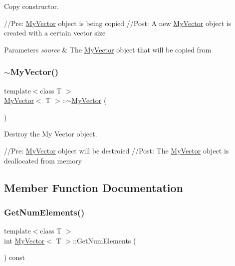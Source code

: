 Copy constructor. 

//\+Pre\+: \mbox{\hyperlink{class_my_vector}{My\+Vector}} object is being copied //\+Post\+: A new \mbox{\hyperlink{class_my_vector}{My\+Vector}} object is created with a certain vector size 
\begin{DoxyParams}{Parameters}
{\em source} & The \mbox{\hyperlink{class_my_vector}{My\+Vector}} object that will be copied from \\
\hline
\end{DoxyParams}
\mbox{\label{class_my_vector_abe59f181259ff63fa583f4bd87a9737e}} 
\subsubsection{\texorpdfstring{$\sim$MyVector()}{~MyVector()}}
{\footnotesize\ttfamily template$<$class T $>$ \\
\mbox{\hyperlink{class_my_vector}{My\+Vector}}$<$ T $>$\+::$\sim$\mbox{\hyperlink{class_my_vector}{My\+Vector}} (\begin{DoxyParamCaption}{ }\end{DoxyParamCaption})}



Destroy the My Vector object. 

//\+Pre\+: \mbox{\hyperlink{class_my_vector}{My\+Vector}} object will be destroied //\+Post\+: The \mbox{\hyperlink{class_my_vector}{My\+Vector}} object is deallocated from memory 

\subsection{Member Function Documentation}
\mbox{\label{class_my_vector_a5806423f48877c084cc436ecdffa756c}} 
\subsubsection{\texorpdfstring{GetNumElements()}{GetNumElements()}}
{\footnotesize\ttfamily template$<$class T $>$ \\
int \mbox{\hyperlink{class_my_vector}{My\+Vector}}$<$ T $>$\+::Get\+Num\+Elements (\begin{DoxyParamCaption}{ }\end{DoxyParamCaption}) const}



